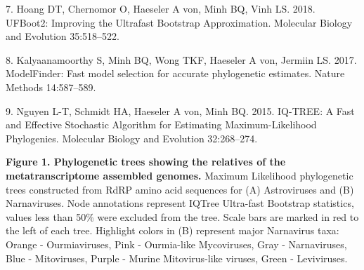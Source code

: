 \documentclass[11pt,]{article}
\begin{document}
\leavevmode\hypertarget{ref-hoang_ufboot2:_2018}{}%
7. Hoang DT, Chernomor O, Haeseler A von, Minh BQ, Vinh LS. 2018.
UFBoot2: Improving the Ultrafast Bootstrap Approximation. Molecular
Biology and Evolution 35:518--522.

\leavevmode\hypertarget{ref-kalyaanamoorthy_modelfinder:_2017}{}%
8. Kalyaanamoorthy S, Minh BQ, Wong TKF, Haeseler A von, Jermiin LS.
2017. ModelFinder: Fast model selection for accurate phylogenetic
estimates. Nature Methods 14:587--589.

\leavevmode\hypertarget{ref-nguyen_iq-tree:_2015}{}%
9. Nguyen L-T, Schmidt HA, Haeseler A von, Minh BQ. 2015. IQ-TREE: A
Fast and Effective Stochastic Algorithm for Estimating
Maximum-Likelihood Phylogenies. Molecular Biology and Evolution
32:268--274.

\newpage

\textbf{Figure 1. Phylogenetic trees showing the relatives of the
metatranscriptome assembled genomes.} Maximum Likelihood phylogenetic
trees constructed from RdRP amino acid sequences for (A) Astroviruses
and (B) Narnaviruses. Node annotations represent IQTree Ultra-fast
Bootstrap statistics, values less than 50\% were excluded from the tree.
Scale bars are marked in red to the left of each tree. Highlight colors
in (B) represent major Narnavirus taxa: Orange - Ourmiaviruses, Pink -
Ourmia-like Mycoviruses, Gray - Narnaviruses, Blue - Mitoviruses, Purple
- Murine Mitovirus-like viruses, Green - Leviviruses.
\end{document}
